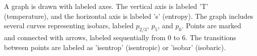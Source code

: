 A graph is drawn with labeled axes. The vertical axis is labeled 'T' (temperature), and the horizontal axis is labeled 's' (entropy). The graph includes several curves representing isobars, labeled \( p_{2/3} \), \( p_5 \), and \( p_0 \). Points are marked and connected with arrows, labeled sequentially from 0 to 6. The transitions between points are labeled as 'isentrop' (isentropic) or 'isobar' (isobaric).